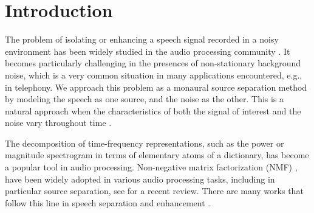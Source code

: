 \section{Introduction}

The problem of isolating or enhancing a speech signal recorded in a noisy environment has been widely
studied in the audio processing community \cite{loizou2007speech,hansler2008speech}. It becomes particularly challenging in the presences of 
non-stationary background noise, which is a very common situation in many applications encountered, e.g., in telephony.
We approach this problem as a monaural source separation method
by modeling the speech as one source, and the noise as the other.
This is a natural approach when the characteristics of both the signal of interest and the noise vary throughout time \cite{WilsonRSD08,JoderWEVS12,MysoreS11,DuanMS12}.

The decomposition of time-frequency representations, such as the power or magnitude spectrogram
in terms of elementary atoms of a dictionary, has become a popular tool in audio processing. 
Non-negative matrix factorization (NMF) \cite{NMF, smaragdis2006probabilistic},
have been widely adopted in various audio processing tasks, including in particular source separation, see \cite{smaragdis2014static} for a recent review. 
There are many works that follow this line in speech separation \cite{schmidt06speechseparation,shashanka_icassp07} and enhancement \cite{JoderWEVS12,DuanMS12,schmidt07mlsp,mohammadiha2013supervised}. %

%

